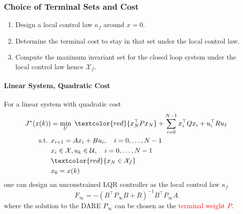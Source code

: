\subsubsection{Choice of Terminal Sets and Cost}

\begin{enumerate}
    \item Design a local control law $\kappa_f$ around $x=0$.
    \item Determine the terminal cost to stay in that set under the local control law.
    \item Compute the maximum invariant set for the closed loop system under the local control law hence $\mathcal{X}_f$.
\end{enumerate}

\paragraph{Linear System, Quadratic Cost}
For a linear system with quadratic cost
\begin{align*}
    J^*(x(k))    & = \min_{U} \;\textcolor{red}{x^\top_N P x_N} + \sum_{i=0}^{N-1} x_i^\top Q x_i + u_i^\top R u_I \\
    \text{s.t. } & x_{i+1} = Ax_i + Bu_i, \quad i = 0, \ldots, N-1                                                 \\
                 & x_i \in \mathcal{X}, u_k \in \mathcal{U}, \quad i = 0, \ldots, N-1                              \\
                 & \textcolor{red}{x_N \in \mathcal{X}_f}                                                          \\
                 & x_0 = x(k)
\end{align*}
one can design an unconstrained LQR controller as the local control law $\kappa_f$
\begin{equation*}
    F_\infty = -{\left(B^\top P_\infty B + R\right)}^{-1} B^\top P_\infty A
\end{equation*}
where the solution to the DARE $P_\infty$ can be chosen as the \textcolor{red}{terminal weight $P$}.

